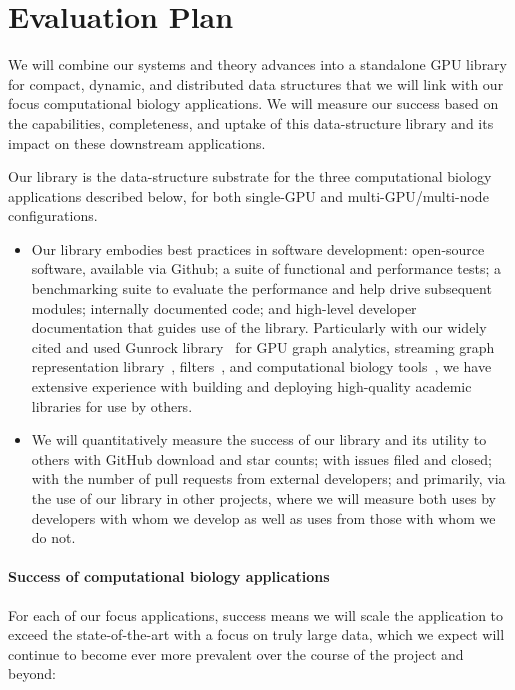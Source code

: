 
\section{Evaluation Plan}

 We will combine our systems and theory advances into a standalone GPU library for compact, dynamic, and distributed data structures that we will link with our focus computational biology applications. We will measure our success based on the capabilities, completeness, and uptake of this data-structure library and its impact on these downstream applications.

Our library is the data-structure substrate for the three computational biology applications described below, for both single-GPU and multi-GPU/multi-node configurations.

\begin{itemize}%
  \item Our library embodies best practices in software development: open-source software, available via Github; a suite of functional and performance tests; a benchmarking suite to evaluate the performance and help drive subsequent modules; internally documented code; and high-level developer documentation that guides use of the library. Particularly with our widely cited and used Gunrock library~\cite{Wang:2017:GGG} for GPU graph analytics, streaming graph representation library~\cite{pandey2021terrace}, filters~\cite{PandeyBJP17,PandeyCDBFJ21}, and computational biology tools~\cite{PandeyBeJo18,PandeyBeJo17b,PandeyAlBe18,pandey2021variantstore}, we have extensive experience with building and deploying high-quality academic libraries for use by others.
  \item We will quantitatively measure the success of our library and its utility to others with GitHub download and star counts; with issues filed and closed; with the number of pull requests from external developers; and primarily, via the use of our library in other projects, where we will measure both uses by developers with whom we develop as well as uses from those with whom we do not.
\end{itemize}

\paragraph{Success of computational biology applications}
For each of our focus applications, success means we will scale the application to exceed the state-of-the-art with a focus on truly large data, which we expect will continue to become ever more prevalent over the course of the project and beyond:

